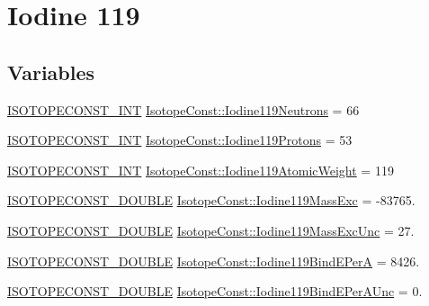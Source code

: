\hypertarget{group___isotope_const-_iodine-_i119}{}\section{Iodine 119}
\label{group___isotope_const-_iodine-_i119}
\subsection*{Variables}
\begin{DoxyCompactItemize}
\item 
\mbox{\hyperlink{group___isotope_const-_macros_ga5f18360b3e99483a35c32d789e62621c}{I\+S\+O\+T\+O\+P\+E\+C\+O\+N\+S\+T\+\_\+\+I\+NT}} \mbox{\hyperlink{group___isotope_const-_iodine-_i119_gaeda21298b19cfe92b18afbe0e29aa348}{Isotope\+Const\+::\+Iodine119\+Neutrons}} = 66
\item 
\mbox{\hyperlink{group___isotope_const-_macros_ga5f18360b3e99483a35c32d789e62621c}{I\+S\+O\+T\+O\+P\+E\+C\+O\+N\+S\+T\+\_\+\+I\+NT}} \mbox{\hyperlink{group___isotope_const-_iodine-_i119_ga5a9695aca449a5242ec4214de4b8b096}{Isotope\+Const\+::\+Iodine119\+Protons}} = 53
\item 
\mbox{\hyperlink{group___isotope_const-_macros_ga5f18360b3e99483a35c32d789e62621c}{I\+S\+O\+T\+O\+P\+E\+C\+O\+N\+S\+T\+\_\+\+I\+NT}} \mbox{\hyperlink{group___isotope_const-_iodine-_i119_ga55c57511aa2e76b245c85af007dee3b1}{Isotope\+Const\+::\+Iodine119\+Atomic\+Weight}} = 119
\item 
\mbox{\hyperlink{group___isotope_const-_macros_ga8f45a7272ce02c0b4c65c44636ed719a}{I\+S\+O\+T\+O\+P\+E\+C\+O\+N\+S\+T\+\_\+\+D\+O\+U\+B\+LE}} \mbox{\hyperlink{group___isotope_const-_iodine-_i119_ga42fd623b6cde9c45e5a7d0915ac39842}{Isotope\+Const\+::\+Iodine119\+Mass\+Exc}} = -\/83765.
\item 
\mbox{\hyperlink{group___isotope_const-_macros_ga8f45a7272ce02c0b4c65c44636ed719a}{I\+S\+O\+T\+O\+P\+E\+C\+O\+N\+S\+T\+\_\+\+D\+O\+U\+B\+LE}} \mbox{\hyperlink{group___isotope_const-_iodine-_i119_gae568a7db9525a3c1452bd6de2ccb8928}{Isotope\+Const\+::\+Iodine119\+Mass\+Exc\+Unc}} = 27.
\item 
\mbox{\hyperlink{group___isotope_const-_macros_ga8f45a7272ce02c0b4c65c44636ed719a}{I\+S\+O\+T\+O\+P\+E\+C\+O\+N\+S\+T\+\_\+\+D\+O\+U\+B\+LE}} \mbox{\hyperlink{group___isotope_const-_iodine-_i119_gaf992103b51ad4bfa8956b7acf2e84fe0}{Isotope\+Const\+::\+Iodine119\+Bind\+E\+PerA}} = 8426.
\item 
\mbox{\hyperlink{group___isotope_const-_macros_ga8f45a7272ce02c0b4c65c44636ed719a}{I\+S\+O\+T\+O\+P\+E\+C\+O\+N\+S\+T\+\_\+\+D\+O\+U\+B\+LE}} \mbox{\hyperlink{group___isotope_const-_iodine-_i119_ga171204817d6f28129100206dc2e23f4d}{Isotope\+Const\+::\+Iodine119\+Bind\+E\+Per\+A\+Unc}} = 0.

\end{DoxyCompactItemize}

